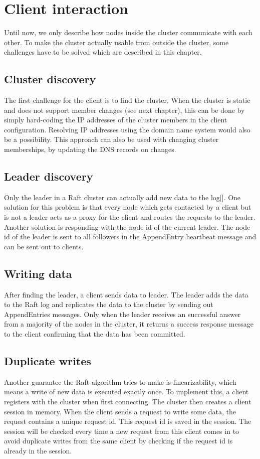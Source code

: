\section{Client interaction}

Until now, we only describe how nodes inside the cluster communicate with each other. To make the cluster actually usable from outside the cluster, some challenges have to be solved which are described in this chapter.

\subsection{Cluster discovery}
The first challenge for the client is to find the cluster. When the cluster is static and does not support member changes (see next chapter), this can be done by simply hard-coding the IP addresses of the cluster members in the client configuration. Resolving IP addresses using the domain name system would also be a possibility. This approach can also be used with changing cluster memberships, by updating the DNS records on changes.

\subsection{Leader discovery}
Only the leader in a Raft cluster can actually add new data to the log[]. One solution for this problem is that every node which gets contacted by a client but is not a leader acts as a proxy for the client and routes the requests to the leader. Another solution is responding with the node id of the current leader. The node id of the leader is sent to all followers in the AppendEntry heartbeat message and can be sent out to clients.

\subsection{Writing data}
After finding the leader, a client sends data to leader. The leader adds the data to the Raft log and replicates the data to the cluster by sending out AppendEntries messages. Only when the leader receives an successful answer from a majority of the nodes in the cluster, it returns a success response message to the client confirming that the data has been committed.

\subsection{Duplicate writes}
Another guarantee the Raft algorithm tries to make is linearizability, which means a write of new data is executed exactly once. To implement this, a client registers with the cluster when first connecting. The cluster then creates a client session in memory. When the client sends a request to write some data, the request contains a unique request id. This request id is saved in the session. The session will be checked every time a new request from this client comes in to avoid duplicate writes from the same client by checking if the request id is already in the session.

